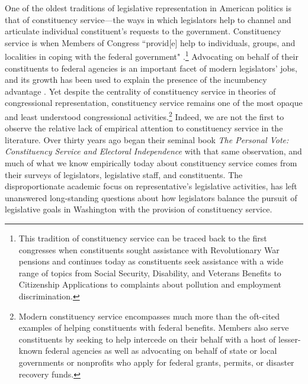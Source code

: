 \documentclass[12pt]{article}
\begin{document}
One of the oldest traditions of legislative representation in American politics is that of constituency service---the ways in which legislators help to channel and articulate individual constituent's requests to the government.  Constituency service is when Members of Congress ``provid[e] help to individuals, groups, and localities in coping with the federal government" \citep{Fenno1978}.\footnote{This tradition of constituency service can be traced back to the first congresses when constituents sought assistance with Revolutionary War pensions \citep{Eckman2017} and continues today as constituents seek assistance with a wide range of topics from Social Security, Disability, and Veterans Benefits to Citizenship Applications to complaints about pollution and employment discrimination.} Advocating on behalf of their constituents to federal agencies is an important facet of modern legislators' jobs, and its growth has been used to explain the presence of the incumbency advantage \citep{King1991}. Yet despite the centrality of constituency service in theories of congressional representation, constituency service remains one of the most opaque and least understood congressional activities.\footnote{Modern constituency service encompasses much more than the oft-cited examples of helping constituents with federal benefits. Members also serve constituents by seeking to help intercede on their behalf with a host of lesser-known federal agencies as well as advocating on behalf of state or local governments or nonprofits who apply for federal grants, permits, or disaster recovery funds.}  Indeed, we are not the first to observe the relative lack of empirical attention to constituency service in the literature.  Over thirty years ago \citet*{CainFerejohnFiorina1987} began their seminal book \emph{The Personal Vote: Constituency Service and Electoral Independence} with that same observation, and much of what we know empirically today about constituency service comes from their surveys of legislators, legislative staff, and constituents. The disproportionate academic focus on representative's legislative activities, has left unanswered long-standing questions about how legislators balance the pursuit of legislative goals in Washington with the provision of constituency service. 
\end{document}

